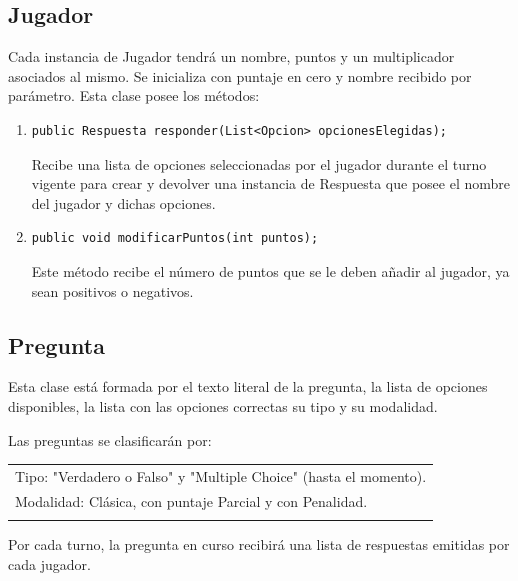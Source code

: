 \documentclass[titlepage,a4paper]{article}
\begin{document}
\subsection{Jugador}
Cada instancia de Jugador tendrá un nombre, puntos y un multiplicador asociados al mismo. Se inicializa con puntaje en cero y nombre recibido por parámetro. Esta clase posee los métodos:
\begin{enumerate}
\item \begin{verbatim}public Respuesta responder(List<Opcion> opcionesElegidas);\end{verbatim} Recibe una lista de opciones seleccionadas por el jugador durante el turno vigente para crear y devolver una instancia de Respuesta que posee el nombre del jugador y dichas opciones. 
\item \begin{verbatim}public void modificarPuntos(int puntos);\end{verbatim} Este método recibe el número de puntos que se le deben añadir al jugador, ya sean positivos o negativos. 
\end{enumerate}

\subsection{Pregunta}
Esta clase está formada por el texto literal de la pregunta, la lista de opciones disponibles, la lista con las opciones correctas su tipo y su modalidad.

Las preguntas se clasificarán por:\\

\begin{tabular}{l}
Tipo: "Verdadero o Falso"$ $ y "Multiple Choice" $ $(hasta el momento).\\
Modalidad: Clásica, con puntaje Parcial y con Penalidad.\\\\
\end{tabular}

Por cada turno, la pregunta en curso recibirá una lista de respuestas emitidas por cada jugador. \\
\end{document}
